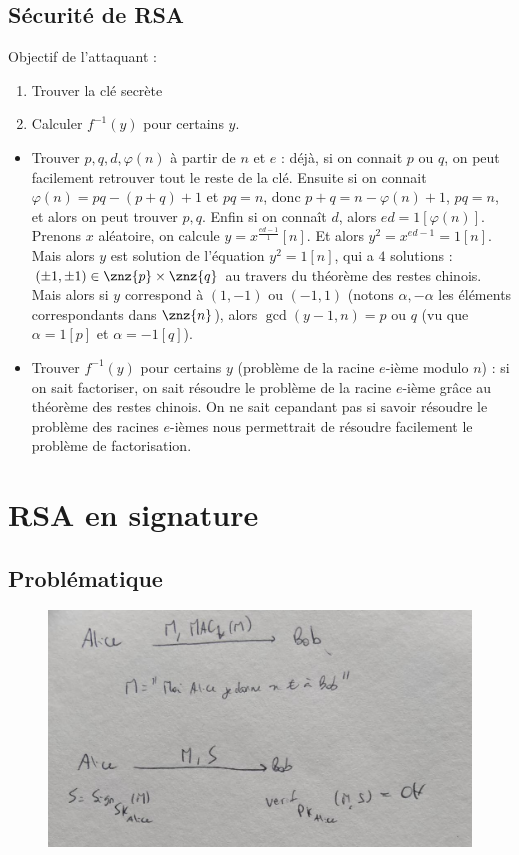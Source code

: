         \subsection{Sécurité de RSA}
            Objectif de l'attaquant :
            \begin{enumerate}
                \item Trouver la clé secrète
                \item Calculer $f^{-1}(y)$ pour certains $y$.
            \end{enumerate}
            \begin{itemize}
                \item Trouver $p, q, d, \varphi(n)$ à partir de $n$ et $e$ : déjà, si on connait $p$ ou $q$, on peut facilement retrouver tout le reste de la clé. Ensuite si on connait $\varphi(n) = pq - (p + q) + 1$ et $pq  = n$, donc $p + q = n - \varphi(n) + 1$, $pq = n$, et alors on peut trouver $p, q$. Enfin si on connaît $d$, alors $ed = 1[\varphi(n)]$. Prenons $x$ aléatoire, on calcule $y = x^{\frac{ed - 1}1} [n]$. Et alors $y^2 = x^{ed - 1} = 1[n]$. Mais alors $y$ est solution de l'équation $y^2 = 1 [n]$, qui a $4$ solutions : $(\pm 1, \pm 1) \in \znz{p} \times \znz{q}$ au travers du théorème des restes chinois. Mais alors si $y$ correspond à $(1, -1)$ ou $(-1, 1)$ (notons $\alpha, -\alpha$ les éléments correspondants dans $\znz{n}$), alors $\gcd(y - 1, n) = p$ ou $q$ (vu que $\alpha = 1[p]$ et $\alpha = -1[q]$).
                \item Trouver $f^{-1}(y)$ pour certains $y$ (problème de la racine $e$-ième modulo $n$) : si on sait factoriser, on sait résoudre le problème de la racine $e$-ième grâce au théorème des restes chinois. On ne sait cepandant pas si savoir résoudre le problème des racines $e$-ièmes nous permettrait de résoudre facilement le problème de factorisation. 
            \end{itemize}

    \section{RSA en signature}
        \subsection{Problématique}
            \begin{figure}[H]
                \centering
                \includegraphics[width=.5\textwidth]{pictures/03}
            \end{figure}
